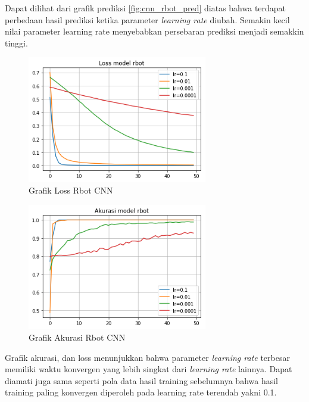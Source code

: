 \documentclass[./skripsi.tex]{subfiles}
\begin{document}
\par Dapat dilihat dari grafik prediksi \ref{fig:cnn_rbot_pred} diatas bahwa terdapat perbedaan hasil prediksi ketika parameter \textit{learning rate} diubah. Semakin kecil nilai parameter learning rate menyebabkan persebaran prediksi menjadi semakkin tinggi.
\begin{figure}%
	\includegraphics[width=0.7\textwidth]{public/assets/img/cnn_rbot_loss.png}
	\caption{Grafik Loss Rbot CNN}
	\label{fig:cnn_rbot_loss}
\end{figure}
\begin{figure}%
	\includegraphics[width=0.7\textwidth]{public/assets/img/cnn_rbot_acc.png}
	\caption{Grafik Akurasi Rbot CNN}
	\label{fig:cnn_rbot_acc}
\end{figure}
\par Grafik akurasi, dan loss menunjukkan bahwa parameter \textit{learning rate} terbesar memiliki waktu konvergen yang lebih singkat dari \textit{learning rate} lainnya. Dapat diamati juga sama seperti pola data hasil training sebelumnya bahwa hasil training paling konvergen diperoleh pada learning rate terendah yakni 0.1.
\end{document}
